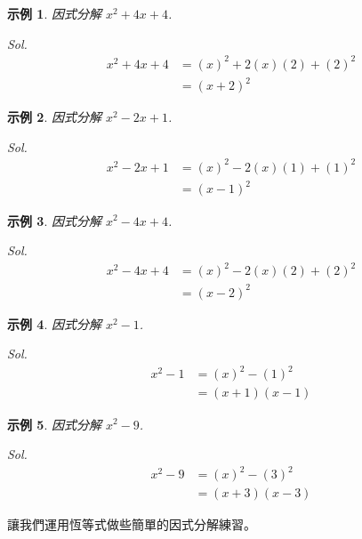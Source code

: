 \documentclass[12pt]{article}
\newtheorem{example}{示例}
\begin{document}
    \begin{example}
        因式分解 $x^2+4x+4$.
    \end{example}
    \textit{ Sol. }\begin{align*}
        x^2+4x+4&=(x)^2+2(x)(2)+(2)^2\\
        &=(x+2)^2
    \end{align*}

    \begin{example}
        因式分解 $x^2-2x+1$.
    \end{example}
    \textit{ Sol. }\begin{align*}
        x^2-2x+1&=(x)^2-2(x)(1)+(1)^2\\
        &=(x-1)^2
    \end{align*}

    \begin{example}
        因式分解 $x^2-4x+4$.
    \end{example}
    \textit{ Sol. }\begin{align*}
        x^2-4x+4&=(x)^2-2(x)(2)+(2)^2\\
        &=(x-2)^2
    \end{align*}

    \begin{example}
        因式分解 $x^2-1$.
    \end{example}
    \textit{ Sol. }\begin{align*}
        x^2-1&=(x)^2-(1)^2\\
        &=(x+1)(x-1)
    \end{align*}

    \begin{example}
        因式分解 $x^2-9$.
    \end{example}
    \textit{ Sol. }\begin{align*}
        x^2-9&=(x)^2-(3)^2\\
        &=(x+3)(x-3)
    \end{align*}

    讓我們運用恆等式做些簡單的因式分解練習。
\end{document}
